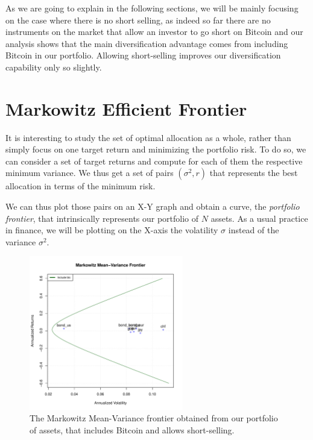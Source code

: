 As we are going to explain in the following sections, we will be mainly focusing on the case where there is no short selling, as indeed so far there are no instruments on the market that allow an investor to go short on Bitcoin and our analysis shows that the main diversification advantage comes from including Bitcoin in our portfolio. Allowing short-selling improves our diversification capability only so slightly.

\section{Markowitz Efficient Frontier}
It is interesting to study the set of optimal allocation as a whole, rather than simply focus on one target return and minimizing the portfolio risk.
To do so, we can consider a set of target returns and compute for each of them the respective minimum variance. We thus get a set of pairs $(\sigma^2, r)$ that represents the best allocation in terms of the minimum risk.

We can thus plot those pairs on an X-Y graph and obtain a curve, the \textit{portfolio frontier}, that intrinsically represents our portfolio of $N$ assets.
As a usual practice in finance, we will be plotting on the X-axis the volatility $\sigma$ instead of the variance $\sigma^2$.

\begin{figure}
	\centering
	\includegraphics[width=0.6\textwidth]{Images/full_frontier.pdf}
	\caption{The Markowitz Mean-Variance frontier obtained from our portfolio of assets, that includes Bitcoin and allows short-selling.}
	\label{fig:full_frontier}
\end{figure}

